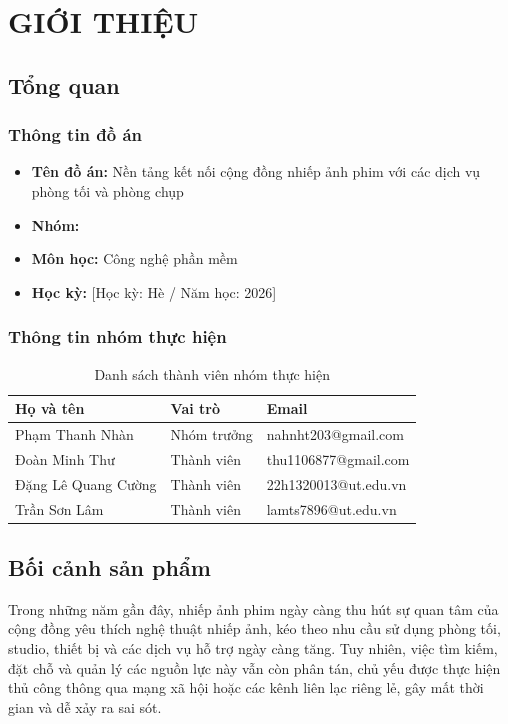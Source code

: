 \chapter{GIỚI THIỆU}

\section{Tổng quan}

\subsection{Thông tin đồ án}
\begin{itemize}
	\item\textbf{Tên đồ án:} Nền tảng kết nối cộng đồng nhiếp ảnh phim với các dịch vụ phòng tối và phòng chụp
	\item\textbf{Nhóm:}  
	\item\textbf{Môn học:} Công nghệ phần mềm 
	\item\textbf{Học kỳ:} [Học kỳ: Hè / Năm học: 2026]
\end{itemize}

\subsection{Thông tin nhóm thực hiện}
\begin{table}[H]
	\centering
	\begin{tabular}{|l|l|l|}
		\hline
		\textbf{Họ và tên} & \textbf{Vai trò} & \textbf{Email} \\
		\hline
		Phạm Thanh Nhàn & Nhóm trưởng & nahnht203@gmail.com \\
		\hline
		Đoàn Minh Thư & Thành viên & thu1106877@gmail.com \\
		\hline
		Đặng Lê Quang Cường & Thành viên & 22h1320013@ut.edu.vn  \\
		\hline
		Trần Sơn Lâm & Thành viên & lamts7896@ut.edu.vn\\
		\hline
	\end{tabular}
	\caption{Danh sách thành viên nhóm thực hiện}
\end{table}

\section{Bối cảnh sản phẩm}

Trong những năm gần đây, nhiếp ảnh phim ngày càng thu hút sự quan tâm của cộng đồng yêu thích nghệ thuật nhiếp ảnh, kéo theo nhu cầu sử dụng phòng tối, studio, thiết bị và các dịch vụ hỗ trợ ngày càng tăng. Tuy nhiên, việc tìm kiếm, đặt chỗ và quản lý các nguồn lực này vẫn còn phân tán, chủ yếu được thực hiện thủ công thông qua mạng xã hội hoặc các kênh liên lạc riêng lẻ, gây mất thời gian và dễ xảy ra sai sót.

